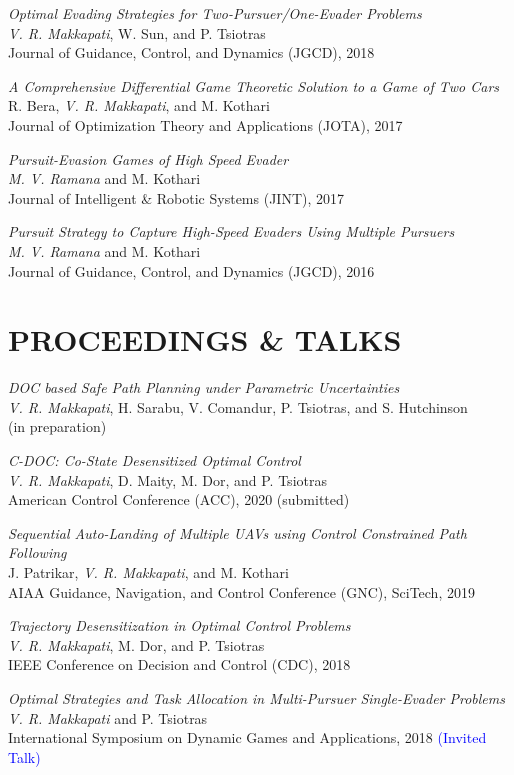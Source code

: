 \documentclass[margin, 10pt]{res} %
\newcommand{\ak}[1]{\textcolor{blue}{#1}}
\begin{document}
\begin{resume}
{\sl Optimal Evading Strategies for Two-Pursuer/One-Evader Problems} \\
\textit{V. R. Makkapati}, W. Sun, and P. Tsiotras \\
Journal of Guidance, Control, and Dynamics (JGCD), 2018

{\sl A Comprehensive Differential Game Theoretic Solution to a Game of Two Cars} \\ 
R. Bera, \textit{V. R. Makkapati}, and M. Kothari \\
Journal of Optimization Theory and Applications (JOTA), 2017 

{\sl Pursuit-Evasion Games of High Speed Evader} \\ 
\textit{M. V. Ramana} and M. Kothari \\
Journal of Intelligent \& Robotic Systems (JINT), 2017

{\sl Pursuit Strategy to Capture High-Speed Evaders Using Multiple Pursuers} \\
\textit{M. V. Ramana} and M. Kothari \\
Journal of Guidance, Control, and Dynamics (JGCD), 2016

\section{PROCEEDINGS \& TALKS}
{\sl DOC based Safe Path Planning under Parametric Uncertainties} \\
\textit{V. R. Makkapati}, H. Sarabu, V. Comandur,  P. Tsiotras, and S. Hutchinson \\
(in preparation)

{\sl C-DOC: Co-State Desensitized Optimal Control} \\
\textit{V. R. Makkapati}, D. Maity, M. Dor, and P. Tsiotras \\
American Control Conference (ACC), 2020 (submitted)

{\sl Sequential Auto-Landing of Multiple UAVs using Control Constrained Path Following} \\
J. Patrikar, \textit{V. R. Makkapati}, and M. Kothari \\
AIAA Guidance, Navigation, and Control Conference (GNC), SciTech, 2019 

{\sl Trajectory Desensitization in Optimal Control Problems} \\
\textit{V. R. Makkapati}, M. Dor, and P. Tsiotras \\
IEEE Conference on Decision and Control (CDC), 2018 

{\sl Optimal Strategies and Task Allocation in Multi-Pursuer Single-Evader Problems}\\
\textit{V. R. Makkapati} and P. Tsiotras \\
International Symposium on Dynamic Games and Applications, 2018 \ak{(Invited Talk)}


\end{resume}
\end{document}
